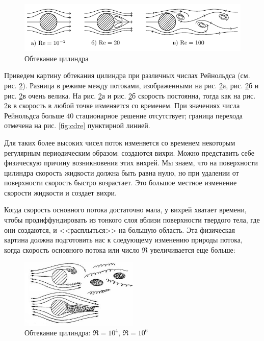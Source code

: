 \begin{figure}[H]
	\centering
	\includegraphics[width=\textwidth]{img/small_Re}
	\caption{Обтекание цилиндра}
	\label{fig:small_Re}
\end{figure}
Приведем картину обтекания цилиндра при различных числах Рейнольдса (см. рис. \ref{fig:small_Re}). Разница в режиме между потоками, изображенными на  рис. \ref{fig:small_Re}а, рис. \ref{fig:small_Re}б и рис. \ref{fig:small_Re}в очень велика. На рис. \ref{fig:small_Re}а и рис. \ref{fig:small_Re}б скорость постоянна, тогда как на  рис. \ref{fig:small_Re}в в скорость в любой точке изменяется со временем. При значениях числа Рейнольдса больше $40$ стационарное решение отсутствует; граница перехода отмечена на рис. \ref{fig:cdre} пунктирной линией. 

Для таких более высоких чисел поток изменяется со временем некоторым регулярным периодическим образом: создаются вихри. Можно представить себе физическую причину возникновения этих вихрей. Мы знаем, что на поверхности цилиндра скорость жидкости должна быть равна нулю, но при удалении от поверхности скорость быстро возрастает. Это большое местное изменение скорости жидкости и создает вихри. 

Когда скорость основного потока достаточно мала, у вихрей хватает времени, чтобы продиффундировать из тонкого слоя вблизи поверхности твердого тела, где они создаются, и <<расплыться>> на большую область. Эта физическая картина должна подготовить нас к следующему изменению природы потока, когда скорость основного потока или число $\Re$ увеличивается еще больше:
\begin{figure}[H]
	\centering
	\includegraphics[width=0.5\textwidth]{img/big_Re.png}
	\caption{Обтекание цилиндра: $\Re=10^4$, $\Re=10^6$}
	\label{fig:small_Re}
\end{figure}

